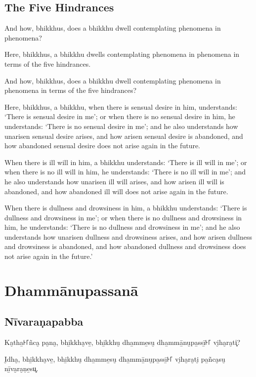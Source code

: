 \section{The Five Hindrances}

And how, bhikkhus, does a bhikkhu dwell contemplating phenomena in phenomena?

Here, bhikkhus, a bhikkhu dwells contemplating phenomena in phenomena in terms
of the five hindrances.

And how, bhikkhus, does a bhikkhu dwell contemplating phenomena in phenomena in
terms of the five hindrances?

Here, bhikkhus, a bhikkhu,
when there is sensual desire in him, understands:
`There is sensual desire in me';
or when there is no sensual desire in him, he understands:
`There is no sensual desire in me';
and he also understands how unarisen sensual desire arises,
and how arisen sensual desire is abandoned,
and how abandoned sensual desire does not arise again in the future.

When there is ill will in him, a bhikkhu understands:
`There is ill will in me';
or when there is no ill will in him, he understands:
`There is no ill will in me';
and he also understands how unarisen ill will arises,
and how arisen ill will is abandoned,
and how abandoned ill will does not arise again in the future.

When there is dullness and drowsiness in him, a bhikkhu understands:
`There is dullness and drowsiness in me';
or when there is no dullness and drowsiness in him, he understands:
`There is no dullness and drowsiness in me';
and he also understands how unarisen dullness and drowsiness arises,
and how arisen dullness and drowsiness is abandoned, and
how abandoned dullness and drowsiness does not arise again in the future.'

\paliPage
\chapter*{Dhammānupassanā}

\section*{Nīvaraṇapabba}

Ka̮tha̱꜔꜒ñca̮ pa̮na̮, bhi̱kkha̮ve̱, bhi̱kkhu̮ dha̱mme̱su̮ dha̱mmā̱nu̮pa̱ssī̱꜔꜒ vi̮ha̮ra̮ti͓?

I̮dha̮, bhi̱kkha̮ve̱, bhi̱kkhu̮ dha̱mme̱su̮ dha̱mmā̱nu̮pa̱ssī̱꜔꜒ vi̮ha̮ra̮ti̮ pa̱ñca̮su̮ nī̱va̮ra̮ṇe̱su͓.

